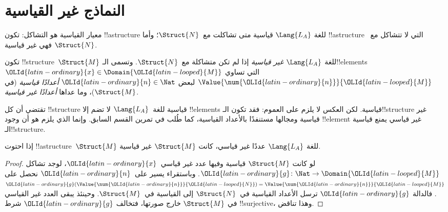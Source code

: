 \documentclass[../../../include/open-logic-section]{subfiles}
\begin{document}
\section{النماذج غير القياسية}

\begin{explain}
معيار القياسية هو التشاكل: تكون !!a{structure} للغة
$\Lang{L_A}$ قياسية متى تشاكلت مع~$\Struct{N}$؛ وأما
!!a{structure} التي لا تتشاكل مع~$\Struct{N}$ فهي غير قياسية.
\end{explain}

\begin{defn}
تكون !!{structure}~$\Struct{M}$ للغة $\Lang{L_A}$ \emph{غير قياسية}
إذا لم تكن متشاكلة مع~$\Struct{N}$. وتسمى الـ!!{element}s
$\OLId{latin-ordinary}{x} \in \Domain{\OLId{latin-looped}{M}}$ التي تساوي $\Value{\num{\OLId{latin-ordinary}{n}}}{\OLId{latin-looped}{M}}$ لبعض
$\OLId{latin-ordinary}{n} \in \Nat$ \emph{أعدادًا قياسية} (في $\Struct{M}$)، وما عداها
\emph{أعدادًا غير قياسية}.
\end{defn}

\begin{explain}
تقتضي  أن كل !!{structure}
قياسية للغة~$\Lang{L_A}$ لا تضم إلا !!{element}s قياسية.
لكن العكس لا يلزم على العموم: فقد تكون الـ!!{structure}
غير قياسية ومجالها مستنفدًا بالأعداد القياسية، كما طُلب
في تمرين القسم السابق. وإنما الذي يلزم هو أن وجود
!!{element} غير قياسي يمنع قياسية الـ!!{structure}.
\end{explain}

\begin{prop}
إذا احتوت !!a{structure}~$\Struct{M}$ للغة $\Lang{L_A}$ عددًا غير
قياسي، كانت $\Struct{M}$ غير قياسية.
\end{prop}

\begin{proof}
لو كانت $\Struct{M}$ قياسية وفيها عدد غير قياسي~$\OLId{latin-ordinary}{x}$،
لوجد تشاكل $\OLId{latin-ordinary}{g}\colon \Nat \to \Domain{\OLId{latin-looped}{M}}$. وباستقراء يسير
على~$\OLId{latin-ordinary}{n}$ نحصل على
$\OLId{latin-ordinary}{g}(\Value{\num{\OLId{latin-ordinary}{n}}}{\OLId{latin-looped}{N}})=\Value{\num{\OLId{latin-ordinary}{n}}}{\OLId{latin-looped}{M}}$. فالدالة $\OLId{latin-ordinary}{g}$
ترسل الأعداد القياسية في~$\Struct{N}$ إلى القياسية في~$\Struct{M}$.
وحينئذ يبقى العدد غير القياسي في $\Struct{M}$ خارج صورتها،
فتخالف $\OLId{latin-ordinary}{g}$ شرط !!{surjective}، وهذا تناقض.
\end{proof}
\end{document}
